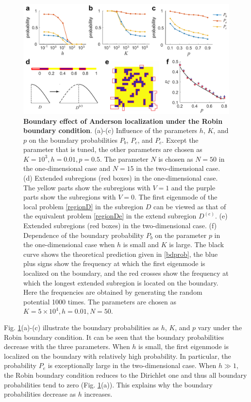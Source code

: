 \documentclass[a4paper,11pt]{article}
\begin{document}
\begin{figure}[!htb]
\centering\includegraphics[width=\linewidth]{Fig3}
\caption{\textbf{Boundary effect of Anderson localization under the Robin boundary condition}. (a)-(c) Influence of the parameters $h$, $K$, and $p$ on the boundary probabilities $P_b$, $P_e$, and $P_c$. Except the parameter that is tuned, the other parameters are chosen as $K = 10^3, h = 0.01, p = 0.5$. The parameter $N$ is chosen as $N = 50$ in the one-dimensional case and $N = 15$ in the two-dimensional case. (d) Extended subregions (red boxes) in the one-dimensional case. The yellow parts show the subregions with $V = 1$ and the purple parts show the subregions with $V = 0$. The first eigenmode of the local problem \eqref{regionD} in the subregion $D$ can be viewed as that of the equivalent problem \eqref{regionDe} in the extend subregion $D^{(e)}$. (e) Extended subregions (red boxes) in the two-dimensional case. (f) Dependence of the boundary probability $P_b$ on the parameter $p$ in the one-dimensional case when $h$ is small and $K$ is large. The black curve shows the theoretical prediction given in \eqref{bdprob}, the blue plus signs show the frequency at which the first eigenmode is localized on the boundary, and the red crosses show the frequency at which the longest extended subregion is located on the boundary. Here the frequencies are obtained by generating the random potential 1000 times. The parameters are chosen as $K = 5 \times 10^4, h = 0.01, N = 50$.}
\label{fig3}
\end{figure}

Fig. \ref{fig3}(a)-(c) illustrate the boundary probabilities as $h$, $K$, and $p$ vary under the Robin boundary condition. It can be seen that the boundary probabilities decrease with the three parameters. When $h$ is small, the first eigenmode is localized on the boundary with relatively high probability. In particular, the probability $P_e$ is exceptionally large in the two-dimensional case. When $h\gg 1$, the Robin boundary condition reduces to the Dirichlet one and thus all boundary probabilities tend to zero (Fig. \ref{fig3}(a)). This explains why the boundary probabilities decrease as $h$ increases.
\end{document}
